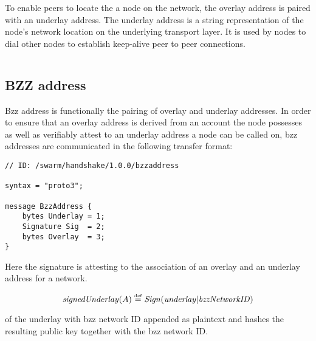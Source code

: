 To enable peers to locate the a node on the network, the overlay address is paired with an underlay address. The underlay address is a string representation of the node's network location on the underlying transport layer. It is used by nodes to dial other nodes to establish keep-alive peer to peer connections. 

\begin{definition}\label{def:underlay}
\begin{lstlisting}[]

\end{lstlisting}
\end{definition}


\subsection{BZZ address \statusyellow}

Bzz address is functionally the pairing of overlay and underlay addresses. In order to ensure that an overlay address is derived from an account the node possesses as well as verifiably attest to an underlay address a node can be called on, bzz addresses are communicated in the following transfer format:

\begin{definition}\label{def:bzz-address}
\begin{lstlisting}[]
// ID: /swarm/handshake/1.0.0/bzzaddress

syntax = "proto3";

message BzzAddress {
    bytes Underlay = 1;
    Signature Sig  = 2;
    bytes Overlay  = 3; 
}
\end{lstlisting}
\end{definition}

Here the signature is attesting to the association of an overlay and an underlay address for a network. 

\begin{definition}\label{def:signed-underlay}
\begin{equation}
\mathit{signedUnderlay}(A) \overset{\textrm{\tiny def}}{=} \mathit{Sign}(\mathit{underlay}|\mathit{bzzNetworkID})         
\end{equation}
\end{definition}

of the underlay with bzz network ID appended as plaintext and hashes the resulting public key together with the bzz network ID. 

